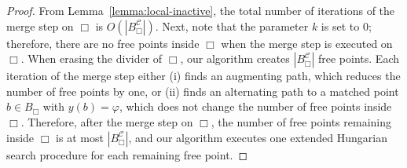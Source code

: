 \documentclass[11pt,onecolumn]{article}
\def\mcC{{\mathcal{C}}}
\newcommand{\cell}{\Box}
\newcommand{\ymax}{\varphi}
\begin{document}
\matchingIterations*
\begin{proof}
    From Lemma~\ref{lemma:local-inactive}, the total number of iterations of the merge step on $\cell$ is $O(|B_\cell^\mcC|)$.
    Next, note that the parameter $k$ is set to $0$; therefore, there are no free points inside $\cell$ when the merge step is executed on $\cell$. When erasing the divider of $\cell$, our algorithm creates $|B_\cell^\mcC|$ free points. Each iteration of the merge step either (i) finds an augmenting path, which reduces the number of free points by one, or (ii) finds an alternating path to a matched point $b\in B_{\cell}$ with $y(b)=\ymax$, which does not change the number of free points inside $\cell$. Therefore, after the merge step on $\cell$, the number of free points remaining inside $\cell$ is at most $|B_\cell^\mcC|$, and our algorithm executes one extended Hungarian search procedure for each remaining free point.
\end{proof}
\end{document}
